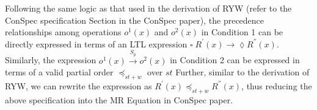 \documentclass[journal,compsoc]{IEEEtran}
\begin{document}
   Following the same logic as that used in the derivation of RYW (refer to the ConSpec specification  Section in the ConSpec paper), %
    the precedence relationships among operations $\mathit{o}^1(x)$ and $\mathit{o}^2(x)$ in Condition 1 can be directly
  expressed in terms of an LTL expression
    $ \square\; R^{'}(x) \rightarrow \lozenge R^{''}(x) $.   Similarly, the expression $\mathit{o}^1(x) \xrightarrow{S_p} \mathit{o}^2(x)$ in Condition 2
  can be expressed in terms of a valid partial order $\preccurlyeq_{\mathit{st}+w} $  over $\mathit{st}$   %
    Further, similar to the derivation of RYW,  we can rewrite the expression %
    as  $R^{'}(x) \preccurlyeq_{\mathit{st}+w} R^{''}(x)$, thus reducing the above specification  into the MR  Equation in ConSpec paper. %
\end{document}
